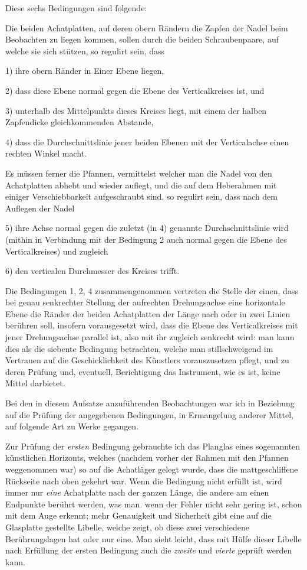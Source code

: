 
Diese sechs Bedingungen sind folgende:

Die beiden Achatplatten, auf deren obern Rändern die Zapfen der Nadel beim Beobachten zu liegen kommen, sollen durch die beiden Schraubenpaare, auf welche sie sich stützen, so regulirt sein, dass

1) ihre obern Ränder in Einer Ebene liegen,

2) dass diese Ebene normal gegen die Ebene des Verticalkreises ist, und

3) unterhalb des Mittelpunkts dieses Kreises liegt, mit einem der halben Zapfendicke gleichkommenden Abstande,

4) dass die Durchschnittslinie jener beiden Ebenen mit der Verticalachse einen rechten Winkel macht.

Es müssen ferner die Pfannen, vermittelst welcher man die Nadel von den Achatplatten abhebt und wieder auflegt, und die auf dem Heberahmen mit einiger Verschiebbarkeit aufgeschraubt sind. so regulirt sein, dass nach dem Auflegen der Nadel

5) ihre Achse normal gegen die zuletzt (in 4) genannte Durchschnittslinie wird (mithin in Verbindung mit der Bedingung 2 auch normal gegen die Ebene des Verticalkreises) und zugleich

6) den verticalen Durchmesser des Kreises trifft.

Die Bedingungen 1, 2, 4 zusammengenommen vertreten die Stelle der einen, dass bei genau senkrechter Stellung der aufrechten Drehungsachse eine horizontale Ebene die Ränder der beiden Achatplatten der Länge nach oder in zwei Linien berühren soll, insofern vorausgesetzt wird, dass die Ebene des Verticalkreises mit jener Drehungsachse parallel ist, also mit ihr zugleich senkrecht wird: man kann dies als die siebente Bedingung betrachten, welche man stillschweigend im Vertrauen auf die Geschicklichkeit des Künstlers vorauszusetzen pflegt, und zu deren Prüfung und, eventuell, Berichtigung das Instrument, wie es ist, keine Mittel darbietet.

Bei den in diesem Aufsatze anzuführenden Beobachtungen war ich in Beziehung auf die Prüfung der angegebenen Bedingungen, in Ermangelung anderer Mittel, auf folgende Art zu Werke gegangen.

Zur Prüfung der \textit{ersten} Bedingung gebrauchte ich das Planglas eines sogenannten künstlichen Horizonts, welches (nachdem vorher der Rahmen mit den Pfannen weggenommen war) so auf die Achatläger gelegt wurde, dass die mattgeschliffene Rückseite nach oben gekehrt war. Wenn die Bedingung nicht erfüllt ist, wird immer nur \textit{eine} Achatplatte nach der ganzen Länge, die andere am einen Endpunkte berührt werden, was man. wenn der Fehler nicht sehr gering ist, schon mit dem Auge erkennt; mehr Genauigkeit und Sicherheit gibt eine auf die Glasplatte gestellte Libelle, welche zeigt, ob diese zwei verschiedene Berührungslagen hat oder nur eine. Man sieht leicht, dass mit Hülfe dieser Libelle nach Erfüllung der ersten Bedingung auch die \textit{zweite} und \textit{vierte} geprüft werden kann.

